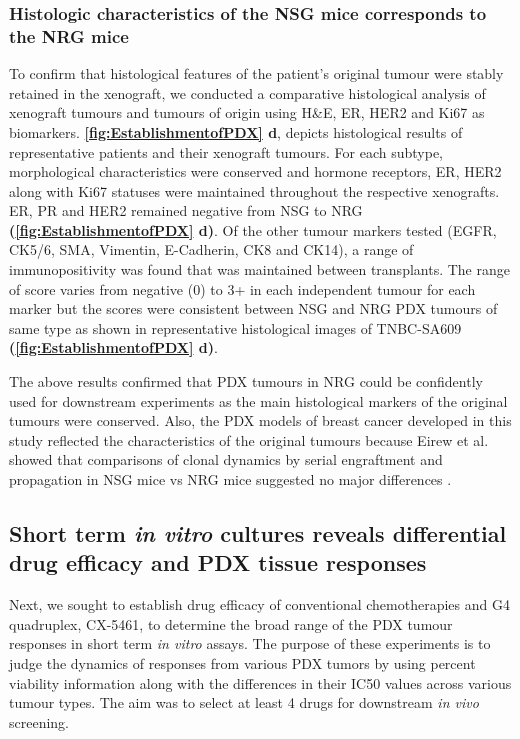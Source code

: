 \subsubsection{Histologic characteristics of the NSG mice corresponds to the NRG mice}

To confirm that histological features of the patient's original tumour were stably retained in the xenograft, we conducted a comparative histological analysis of xenograft tumours and tumours of origin using H\&E, ER, HER2 and Ki67 as biomarkers. 
\textbf{\autoref{fig:EstablishmentofPDX} d}, depicts histological results of representative patients and their xenograft tumours. For each subtype, morphological characteristics were conserved and hormone receptors, ER, HER2 along with Ki67 statuses were maintained throughout the respective xenografts. ER, PR and HER2 remained negative from NSG to NRG \textbf{(\autoref{fig:EstablishmentofPDX} d)}. 
Of the other tumour markers tested (EGFR, CK5/6, SMA, Vimentin, E-Cadherin, CK8 and CK14), a range of immunopositivity was found that was maintained between transplants. The range of score varies from negative (0) to 3+ in each independent tumour for each marker but the scores were consistent between NSG and NRG PDX tumours of same type as shown in representative histological images of TNBC-SA609 \textbf{(\autoref{fig:EstablishmentofPDX} d)}.


 The above results confirmed that PDX tumours in \ac{NRG} could be confidently used for downstream experiments as the main histological markers of the original tumours were conserved. Also, the PDX models of breast cancer developed in this study reflected the characteristics of the original tumours because Eirew et al. showed that comparisons of clonal dynamics by serial engraftment and propagation in NSG mice vs NRG mice suggested no major differences \cite{eirew2015dynamics}.



\subsection{Short term \textit {in vitro} cultures reveals differential drug efficacy and PDX tissue responses
}
Next, we sought to establish drug efficacy of conventional chemotherapies and G4 quadruplex, CX-5461, to determine the broad range of the PDX tumour responses in short term \textit{in vitro} assays. The purpose of these experiments is to judge the dynamics of responses from various PDX tumors by using percent viability information along with the differences in their IC50 values across various tumour types. 
The aim was to select at least 4 drugs for downstream \textit{in vivo} screening.

